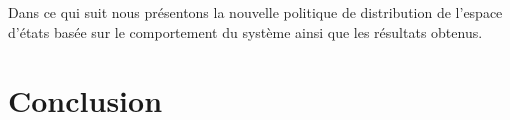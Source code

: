 Dans ce qui suit nous présentons la nouvelle politique de distribution de l’espace d’états basée sur le comportement du système ainsi que les résultats obtenus. 
 
 






\section{Conclusion}